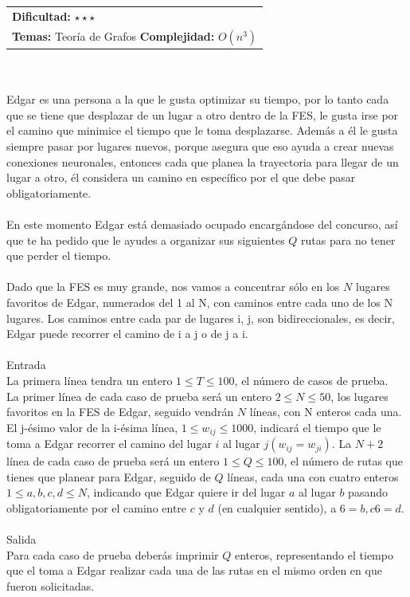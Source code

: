 \documentclass[12pt]{article}
\begin{document}
{{{\hfill
\begin{tabular}{@{}l@{}}
\textbf{Dificultad:} $\star\star\star$ \\
\textbf{Temas:} Teoría de Grafos
\textbf{Complejidad:} $O(n^3)$
\end{tabular}\\
\\
Edgar es una persona a la que le gusta optimizar su tiempo, por lo tanto cada que se tiene que desplazar de un lugar a otro dentro de la FES, le gusta irse por el camino que minimice el tiempo que le toma desplazarse. Además
a él le gusta siempre pasar por lugares nuevos, porque asegura que eso ayuda a crear nuevas conexiones neuronales, entonces cada que planea la trayectoria para llegar de un lugar a otro, él considera un camino en específico por el
que debe pasar obligatoriamente.\\
\\En este momento Edgar está demasiado ocupado encargándose del concurso, así que te ha pedido que le ayudes a organizar sus siguientes $Q$ rutas para no tener que perder el tiempo.\\
\\Dado que la FES es muy grande, nos vamos a concentrar sólo en los $N$ lugares favoritos de Edgar, numerados del 1 al N, con caminos entre cada uno de los N lugares. Los caminos entre cada par de lugares i, j, son bidireccionales, es decir, Edgar puede recorrer el camino de i a j o de j a i.
\\
\\
\textrm{\large Entrada}
\\
La primera línea tendra un entero $1 ≤ T ≤ 100$, el número de casos de prueba.\\ La primer línea de cada caso de prueba será un entero $2 ≤ N ≤ 50$, los lugares favoritos en la FES de Edgar, seguido vendrán $N$ líneas, con N enteros cada una. El j-ésimo valor de la i-ésima línea, $1 ≤ w_{ij} ≤ 1000$, indicará el tiempo que le toma a Edgar recorrer el camino del lugar $i$ al lugar $j (w_{ij} = w_{ji})$. La $N + 2$ línea de cada caso de prueba será un entero $1 ≤ Q ≤ 100$, el número de rutas que tienes que planear para Edgar, seguido de $Q$ líneas, cada una con cuatro enteros $1 ≤ a, b, c, d ≤ N$, indicando que Edgar quiere ir del lugar $a$ al lugar $b$ pasando obligatoriamente por el camino entre $c$ y $d$ (en cualquier sentido), a $6= b, c 6= d$.
\\
\\
\textrm{\large Salida}
\\
Para cada caso de prueba deberás imprimir $Q$ enteros, representando el tiempo que el toma a Edgar realizar cada una de las rutas en el mismo orden en que fueron solicitadas.
}}}
\end{document}
